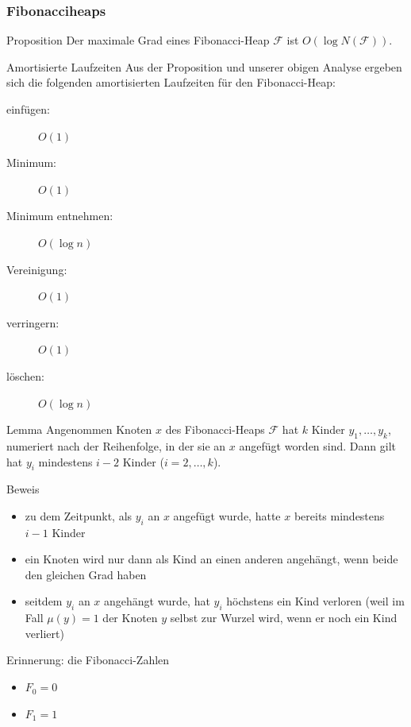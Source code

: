 \documentclass[aspectratio=1610, 11pt]{beamer}
\newcommand\cF{\mathcal F}
\newcommand{\mytitle}{Fibonacciheaps}
\begin{document}
\begin{frame}\frametitle{\mytitle}
	\begin{overprint}
		\begin{block}{Proposition}
			Der maximale Grad eines Fibonacci-Heap $\cF$ ist $O(\log N(\cF))$.
		\end{block}	
		\begin{exampleblock}{Amortisierte Laufzeiten}
			Aus der Proposition und unserer obigen Analyse ergeben sich die folgenden amortisierten Laufzeiten f\"ur den Fibonacci-Heap:
			\begin{description}
				\item[einf\"ugen:] $O(1)$
				\item[Minimum:] $O(1)$
				\item[Minimum entnehmen:] $O(\log n)$
				\item[Vereinigung:] $O(1)$
				\item[verringern:] $O(1)$
				\item[l\"oschen:] $O(\log n)$
			\end{description}
		\end{exampleblock}
		\begin{block}{Lemma}
			Angenommen Knoten $x$ des Fibonacci-Heaps $\cF$ hat $k$ Kinder $y_1,\ldots,y_k$, numeriert nach der Reihenfolge, in der sie an $x$ angef\"ugt worden sind.
			Dann gilt hat $y_i$ mindestens $i-2$ Kinder ($i=2,\ldots,k$).
		\end{block}	
		\begin{exampleblock}{Beweis}
			\begin{itemize}
				\item zu dem Zeitpunkt, als $y_i$ an $x$ angef\"ugt wurde, hatte $x$ bereits mindestens $i-1$ Kinder
				\item ein Knoten wird nur dann als Kind an einen anderen angeh\"angt, wenn beide den gleichen Grad haben
				\item seitdem $y_i$ an $x$ angeh\"angt wurde, hat $y_i$ h\"ochstens ein Kind verloren (weil im Fall $\mu(y)=1$ der Knoten $y$ selbst zur Wurzel wird, wenn er noch ein Kind verliert)
			\end{itemize}
		\end{exampleblock}
		\begin{exampleblock}{Erinnerung: die Fibonacci-Zahlen}
			\begin{itemize}
				\item $F_0=0$
				\item $F_1=1$

\end{itemize}
\end{exampleblock}
\end{overprint}
\end{frame}
\end{document}
